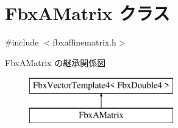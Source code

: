 \hypertarget{class_fbx_a_matrix}{}\section{Fbx\+A\+Matrix クラス}
\label{class_fbx_a_matrix}


{\ttfamily \#include $<$fbxaffinematrix.\+h$>$}

Fbx\+A\+Matrix の継承関係図\begin{figure}[H]
\begin{center}
\leavevmode
\includegraphics[height=2.000000cm]{class_fbx_a_matrix}
\end{center}
\end{figure}
